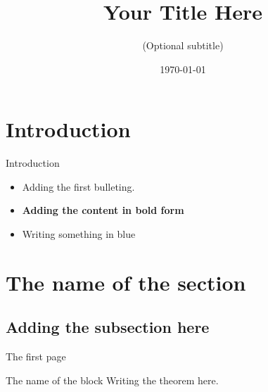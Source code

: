 \documentclass{beamer}
\title{Your Title Here}
\subtitle{(Optional subtitle)}
\author{ }
\institute{\bf  }
\date{\today}
\begin{document}
\begin{frame}
	\titlepage
\end{frame}


\section{Introduction}
\begin{frame}{Introduction}
	\begin{itemize}
		\item Adding the first bulleting.
		\item \textbf{Adding the content in bold form}
		\item {\color{blue}Writing something in blue}

	\end{itemize}

\end{frame}

\section{The name of the section}
\subsection{Adding the subsection here}
\begin{frame}{The first page}
	\begin{block}{The name of the block}
		Writing the theorem here.
	\end{block}
\end{frame}
\end{document}
